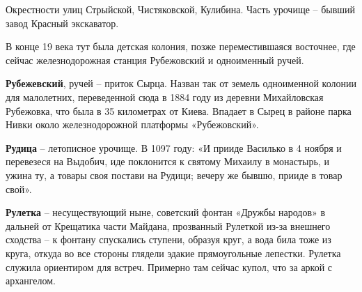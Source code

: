 Окрестности улиц Стрыйской, Чистяковской, Кулибина. Часть урочище – бывший завод Красный экскаватор.

В конце 19 века тут была детская колония, позже переместившаяся восточнее, где сейчас железнодорожная станция Рубежовский и одноименный ручей.\\

\medskip

\textbf{Рубежевский}, ручей – приток Сырца. Назван так от земель одноименной колонии для малолетних, переведенной сюда в 1884 году из деревни Михайловская Рубежовка, что была в 35 километрах от Киева. Впадает в Сырец в районе парка Нивки около железнодорожной платформы «Рубежовский».\\

\medskip


\textbf{Рудица} – летописное урочище. В 1097 году: «И прииде Василько в 4 ноября и перевезеся на Выдобич, иде поклонится к святому Михаилу в монастырь, и ужина ту, а товары своя постави на Рудици; вечеру же бывшю, прииде в товар свой».\\

\medskip


\textbf{Рулетка} – несуществующий ныне, советский фонтан «Дружбы народов» в дальней от Крещатика части Майдана, прозванный Рулеткой из-за внешнего сходства – к фонтану спускались ступени, образуя круг, а вода била тоже из круга, откуда во все стороны глядели эдакие прямоугольные лепестки. Рулетка служила ориентиром для встреч. Примерно там сейчас купол, что за аркой с архангелом.
